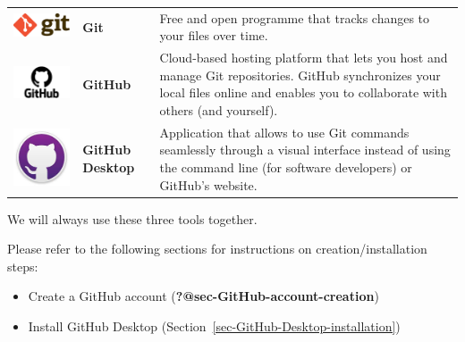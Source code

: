 \documentclass[
  letterpaper,
  DIV=11,
  numbers=noendperiod,
  oneside]{scrreprt}
\providecommand{\tightlist}{%
  \setlength{\itemsep}{0pt}\setlength{\parskip}{0pt}}\usepackage{longtable,booktabs,array}
\begin{document}
\begin{longtable}[]{@{}
  >{\centering\arraybackslash}p{}
  >{\centering\arraybackslash}p{}
  >{\raggedright\arraybackslash}p{}@{}}
\toprule()
\endhead
\includegraphics{./images/paste-5B5DE956.png} & \textbf{Git} & Free and
open programme that tracks changes to your files over time. \\
\includegraphics{./images/paste-A0B6FCC4.png} & \textbf{GitHub} &
Cloud-based hosting platform that lets you host and manage Git
repositories. GitHub synchronizes your local files online and enables
you to collaborate with others (and yourself). \\
\includegraphics[width=1.25in,height=\textheight]{./images/paste-B8632B75.png}
& \textbf{GitHub Desktop} & Application that allows to use Git commands
seamlessly through a visual interface instead of using the command line
(for software developers) or GitHub's website. \\
\bottomrule()
\end{longtable}

We will always use these three tools together.

Please refer to the following sections for instructions on
creation/installation steps:

\begin{itemize}
\tightlist
\item
  Create a GitHub account (\textbf{?@sec-GitHub-account-creation})
\item
  Install GitHub Desktop (Section~\ref{sec-GitHub-Desktop-installation})
\end{itemize}
\end{document}
